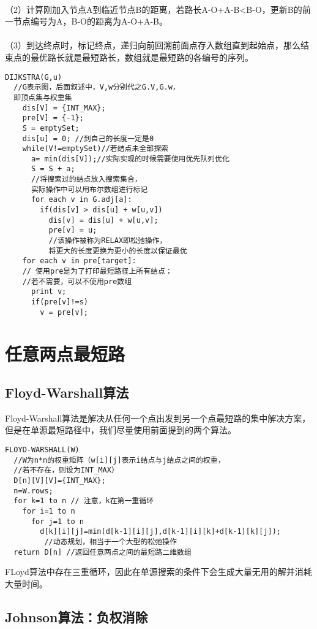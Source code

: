 \documentclass[12pt,a4paper,UTF16]{ctexbook}
\theoremstyle{plain}
\begin{document}
\paragraph{}（2）计算刚加入节点A到临近节点B的距离，若路长A-O+A-B<B-O，更新B的前一节点编号为A，B-O的距离为A-O+A-B。
\paragraph{}（3）到达终点时，标记终点，递归向前回溯前面点存入数组直到起始点，那么结束点的最优路长就是最短路长，数组就是最短路的各编号的序列。
\begin{lstlisting}[basicstyle=\ttfamily]
  DIJKSTRA(G,u) 
  //G表示图，后面叙述中，V,w分别代之G.V,G.w，
  即顶点集与权重集
    dis[V] = {INT_MAX};
    pre[V] = {-1};
    S = emptySet;
    dis[u] = 0; //到自己的长度一定是0
    while(V!=emptySet)//若结点未全部探索
      a= min(dis[V]);//实际实现的时候需要使用优先队列优化
      S = S + a; 
      //将搜索过的结点放入搜索集合，
      实际操作中可以用布尔数组进行标记
      for each v in G.adj[a]:
        if(dis[v] > dis[u] + w[u,v])
          dis[v] = dis[u] + w[u,v];
          pre[v] = u; 
          //该操作被称为RELAX即松弛操作，
          将更大的长度更换为更小的长度以保证最优
    for each v in pre[target]: 
    // 使用pre是为了打印最短路径上所有结点；
    //若不需要，可以不使用pre数组
      print v;
      if(pre[v]!=s)
        v = pre[v];  
\end{lstlisting}
\section{任意两点最短路}
\subsection{Floyd-Warshall算法}
Floyd-Warshall算法是解决从任何一个点出发到另一个点最短路的集中解决方案，但是在单源最短路径中，我们尽量使用前面提到的两个算法。
\begin{lstlisting}[basicstyle=\ttfamily]
  FLOYD-WARSHALL(W) 
  //W为n*n的权重矩阵（w[i][j]表示i结点与j结点之间的权重，
  //若不存在，则设为INT_MAX）
  D[n][V][V]={INT_MAX};
  n=W.rows;
  for k=1 to n // 注意，k在第一重循环
    for i=1 to n
      for j=1 to n
        d[k][i][j]=min(d[k-1][i][j],d[k-1][i][k]+d[k-1][k][j]);
         //动态规划，相当于一个大型的松弛操作
  return D[n] //返回任意两点之间的最短路二维数组
\end{lstlisting}
FLoyd算法中存在三重循环，因此在单源搜索的条件下会生成大量无用的解并消耗大量时间。
\subsection{Johnson算法：负权消除}
\end{document}
